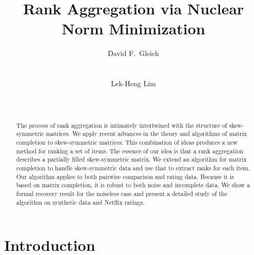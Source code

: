 \documentclass{sig-alternate}
\begin{document}
 

\title{Rank Aggregation via Nuclear Norm Minimization}



\author{
\alignauthor
David F.~Gleich\\
       \\
       \\
\alignauthor
Lek-Heng Lim\\
			 \\
			 \\
}

\maketitle


\begin{abstract} 
The process of rank aggregation is intimately intertwined with
the structure of skew-symmetric matrices.  
We apply recent advances in the theory and algorithms of matrix completion
to skew-symmetric matrices.  This combination of ideas
produces a new method for ranking a set of items.  The essence
of our idea is that a rank aggregation describes a partially
filled skew-symmetric matrix.  We extend an algorithm for
matrix completion to handle skew-symmetric data and use that
to extract ranks for each item.  
Our algorithm applies to both pairwise comparison and rating data.
Because it is based on matrix completion, it is robust to
both noise and incomplete data.  We show a formal
recovery result for the noiseless case and 
present a detailed study of the algorithm on synthetic
data and Netflix ratings.
\end{abstract} 


\section{Introduction}
\end{document}
